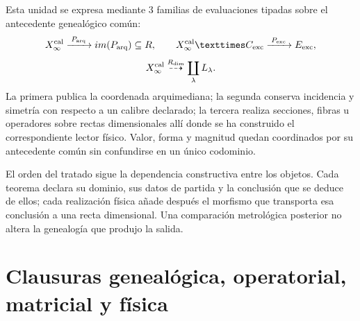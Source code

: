 Esta unidad se expresa mediante \(3\) familias de evaluaciones tipadas sobre
el antecedente genealógico común:
\[
 \mathcal X_\infty^{\rm cal}
 \xrightarrow{\;\mathcal P_{\rm arq}\;}
 \operatorname{im}(\mathcal P_{\rm arq})\subseteq\mathbb R,
 \qquad
 \mathcal X_\infty^{\rm cal}\times\mathcal C_{\rm exc}
 \xrightarrow{\;\mathcal P_{\rm exc}\;}
 \mathcal E_{\rm exc},
\]
\[
 \mathcal X_\infty^{\rm cal}
 \overset{\mathcal R_{\rm dim}}{\dashrightarrow}
 \coprod_{\lambda}\mathcal L_\lambda .
\]
La primera publica la coordenada arquimediana; la segunda conserva
incidencia y simetría con respecto a un calibre declarado; la tercera realiza
secciones, fibras u operadores sobre rectas dimensionales allí donde se ha
construido el correspondiente lector físico. Valor, forma y magnitud quedan
coordinados por su antecedente común sin confundirse en un único codominio.

El orden del tratado sigue la dependencia constructiva entre los objetos.
Cada teorema declara su dominio, sus datos de partida y la conclusión que se
deduce de ellos; cada realización física añade después el morfismo que
transporta esa conclusión a una recta dimensional. Una comparación
metrológica posterior no altera la genealogía que produjo la salida.

\section*{Clausuras genealógica, operatorial, matricial y física}

